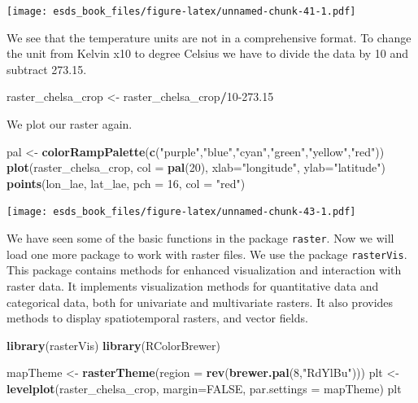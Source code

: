 \documentclass[
]{book}
\newenvironment{Shaded}{\begin{snugshade}}{\end{snugshade}}
\newcommand{\DataTypeTok}[1]{\textcolor[rgb]{0.13,0.29,0.53}{#1}}
\newcommand{\DecValTok}[1]{\textcolor[rgb]{0.00,0.00,0.81}{#1}}
\newcommand{\FloatTok}[1]{\textcolor[rgb]{0.00,0.00,0.81}{#1}}
\newcommand{\KeywordTok}[1]{\textcolor[rgb]{0.13,0.29,0.53}{\textbf{#1}}}
\newcommand{\NormalTok}[1]{#1}
\newcommand{\OperatorTok}[1]{\textcolor[rgb]{0.81,0.36,0.00}{\textbf{#1}}}
\newcommand{\OtherTok}[1]{\textcolor[rgb]{0.56,0.35,0.01}{#1}}
\newcommand{\StringTok}[1]{\textcolor[rgb]{0.31,0.60,0.02}{#1}}
\begin{document}
\texttt{[image: esds\_book\_files/figure-latex/unnamed-chunk-41-1.pdf]}

We see that the temperature units are not in a comprehensive format. To change the unit from Kelvin x10 to degree Celsius we have to divide the data by 10 and subtract 273.15.

\begin{Shaded}
\begin{Highlighting}[]
\NormalTok{raster_chelsa_crop <-}\StringTok{ }\NormalTok{raster_chelsa_crop}\OperatorTok{/}\DecValTok{10}\FloatTok{-273.15}
\end{Highlighting}
\end{Shaded}

We plot our raster again.

\begin{Shaded}
\begin{Highlighting}[]
\NormalTok{pal <-}\StringTok{ }\KeywordTok{colorRampPalette}\NormalTok{(}\KeywordTok{c}\NormalTok{(}\StringTok{"purple"}\NormalTok{,}\StringTok{"blue"}\NormalTok{,}\StringTok{"cyan"}\NormalTok{,}\StringTok{"green"}\NormalTok{,}\StringTok{"yellow"}\NormalTok{,}\StringTok{"red"}\NormalTok{))}
\KeywordTok{plot}\NormalTok{(raster_chelsa_crop, }\DataTypeTok{col =} \KeywordTok{pal}\NormalTok{(}\DecValTok{20}\NormalTok{), }\DataTypeTok{xlab=}\StringTok{"longitude"}\NormalTok{, }\DataTypeTok{ylab=}\StringTok{"latitude"}\NormalTok{)}
\KeywordTok{points}\NormalTok{(lon_lae, lat_lae, }\DataTypeTok{pch =} \DecValTok{16}\NormalTok{, }\DataTypeTok{col =} \StringTok{"red"}\NormalTok{)}
\end{Highlighting}
\end{Shaded}

\texttt{[image: esds\_book\_files/figure-latex/unnamed-chunk-43-1.pdf]}

We have seen some of the basic functions in the package \texttt{raster}. Now we will load one more package to work with raster files. We use the package \texttt{rasterVis}. This package contains methods for enhanced visualization and interaction with raster data. It implements visualization methods for quantitative data and categorical data, both for univariate and multivariate rasters. It also provides methods to display spatiotemporal rasters, and vector fields.

\begin{Shaded}
\begin{Highlighting}[]
\KeywordTok{library}\NormalTok{(rasterVis)}
\KeywordTok{library}\NormalTok{(RColorBrewer)}

\NormalTok{mapTheme <-}\StringTok{ }\KeywordTok{rasterTheme}\NormalTok{(}\DataTypeTok{region =} \KeywordTok{rev}\NormalTok{(}\KeywordTok{brewer.pal}\NormalTok{(}\DecValTok{8}\NormalTok{,}\StringTok{"RdYlBu"}\NormalTok{)))}
\NormalTok{plt <-}\StringTok{ }\KeywordTok{levelplot}\NormalTok{(raster_chelsa_crop, }\DataTypeTok{margin=}\OtherTok{FALSE}\NormalTok{, }\DataTypeTok{par.settings =}\NormalTok{ mapTheme)}
\NormalTok{plt}
\end{Highlighting}
\end{Shaded}
\end{document}
